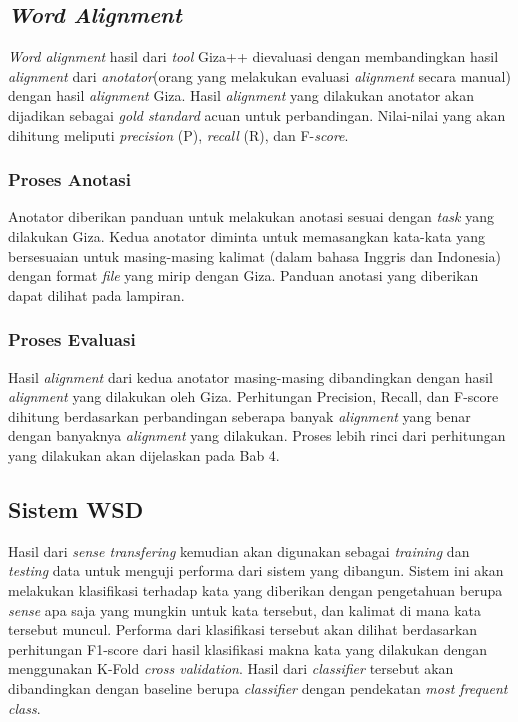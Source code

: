 \subsection{\textit{Word Alignment}}
\textit{Word alignment} hasil dari \textit{tool} Giza++ dievaluasi dengan membandingkan hasil \textit{alignment} dari \textit{anotator}(orang yang melakukan evaluasi \textit{alignment} secara manual) dengan hasil \textit{alignment} Giza. Hasil \textit{alignment} yang dilakukan anotator akan dijadikan sebagai \textit{gold standard} acuan untuk perbandingan. Nilai-nilai yang akan dihitung meliputi \textit{precision} (P), \textit{recall} (R), dan F-\textit{score}. 

\subsubsection{Proses Anotasi}

Anotator diberikan panduan untuk melakukan anotasi sesuai dengan \textit{task} yang dilakukan Giza. Kedua anotator diminta untuk memasangkan kata-kata yang bersesuaian untuk masing-masing kalimat (dalam bahasa Inggris dan Indonesia) dengan format \textit{file} yang mirip dengan Giza. Panduan anotasi yang diberikan dapat dilihat pada lampiran.

\subsubsection{Proses Evaluasi}

Hasil \textit{alignment} dari kedua anotator masing-masing dibandingkan dengan hasil \textit{alignment} yang dilakukan oleh Giza. Perhitungan Precision, Recall, dan F-score dihitung berdasarkan perbandingan seberapa banyak \textit{alignment} yang benar dengan banyaknya \textit{alignment} yang dilakukan. Proses lebih rinci dari perhitungan yang dilakukan akan dijelaskan pada Bab 4.

\subsection{Sistem WSD}
Hasil dari \textit{sense transfering} kemudian akan digunakan sebagai \textit{training} dan \textit{testing} data untuk menguji performa dari sistem yang dibangun. 
Sistem ini akan melakukan klasifikasi terhadap kata yang diberikan dengan pengetahuan berupa \textit{sense} apa saja yang mungkin untuk kata tersebut, dan kalimat di mana kata tersebut muncul. Performa dari klasifikasi tersebut akan dilihat berdasarkan perhitungan F1-score dari hasil klasifikasi makna kata yang dilakukan dengan menggunakan K-Fold \textit{cross validation}. Hasil dari \textit{classifier} tersebut akan dibandingkan dengan baseline berupa \textit{classifier} dengan pendekatan \textit{most frequent class}.